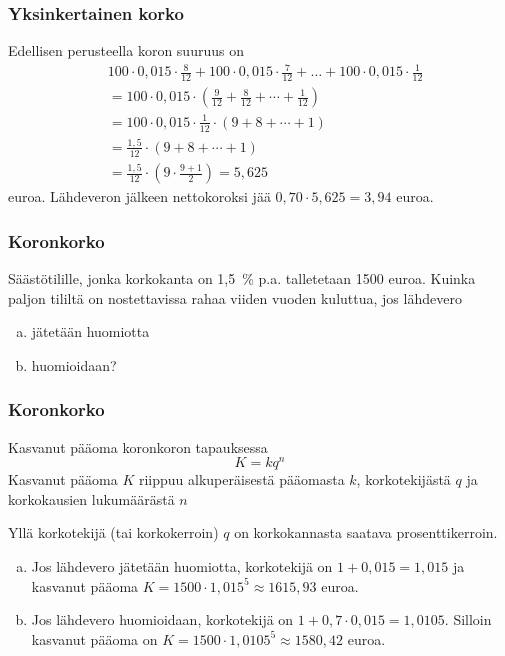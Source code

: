 \documentclass[]{beamer}
\begin{document}
\begin{frame}
\frametitle{Yksinkertainen korko}
	\begin{ratkaisu}		
		Edellisen perusteella koron suuruus on 
		\begin{align*}
			&100\cdot0,015\cdot\frac{8}{12}+100\cdot0,015\cdot\frac{7}{12}+\ldots+100\cdot0,015\cdot\frac{1}{12} \\
			&= 100\cdot0,015\cdot\left(\frac{9}{12} + \frac{8}{12} + \cdots +\frac{1}{12}\right)\\
			&= 100\cdot0,015\cdot\frac{1}{12}\cdot(9+8+\cdots+1)\\
			&= \frac{1,5}{12}\cdot(9+8+\cdots+1)\\
			&= \frac{1,5}{12}\cdot\left( 9\cdot\frac{9+1}{2}\right) = 5,625
		\end{align*}
		euroa. Lähdeveron jälkeen nettokoroksi jää \(0,70\cdot5,625=3,94\) euroa.
	\end{ratkaisu}
\end{frame}

\begin{frame}
\frametitle{Koronkorko}
	\begin{esim}
		Säästötilille, jonka korkokanta on 1,5~\% p.a. talletetaan 1500 euroa.
		Kuinka paljon tililtä on nostettavissa rahaa viiden vuoden kuluttua, jos lähdevero
		\begin{enumerate}[(a)]
			\item jätetään huomiotta
			\item huomioidaan?
		\end{enumerate}
	\end{esim}
\end{frame}

\begin{frame}
\frametitle{Koronkorko}
	\begin{block}{Kasvanut pääoma koronkoron tapauksessa}
		\[
			K = kq^n
		\]
		Kasvanut pääoma \(K\) riippuu alkuperäisestä pääomasta \(k\), korkotekijästä \(q\) ja korkokausien lukumäärästä \(n\)
	\end{block}
	Yllä korkotekijä (tai korkokerroin) \(q\) on korkokannasta saatava prosenttikerroin.
\end{frame}

\begin{frame}
 	\begin{ratkaisu}
 		\begin{enumerate}[(a)]
 			\item Jos lähdevero jätetään huomiotta, korkotekijä on \(1+ 0,015 = 1,015\) ja kasvanut pääoma
 			\(K=1500\cdot1,015^5\approx 1615,93\) euroa.
 			\item Jos lähdevero huomioidaan, korkotekijä on \(1+0,7\cdot0,015=	1,0105\). Silloin kasvanut pääoma on
 			\(K=1500\cdot1,0105^5\approx	1580,42\) euroa.
 		\end{enumerate}
 	\end{ratkaisu}
\end{frame}
\end{document}
